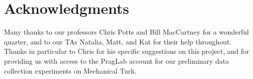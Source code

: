 \documentclass[11pt]{article}
\begin{document}
\section*{Acknowledgments}

Many thanks to our professors Chris Potts and Bill MacCartney for a wonderful quarter, and to our TAs Natalia, Matt, and Kat for their help throughout. Thanks in particular to Chris for his specific suggestions on this project, and for providing us with access to the PragLab account for our preliminary data collection experiments on Mechanical Turk.




\end{document}
